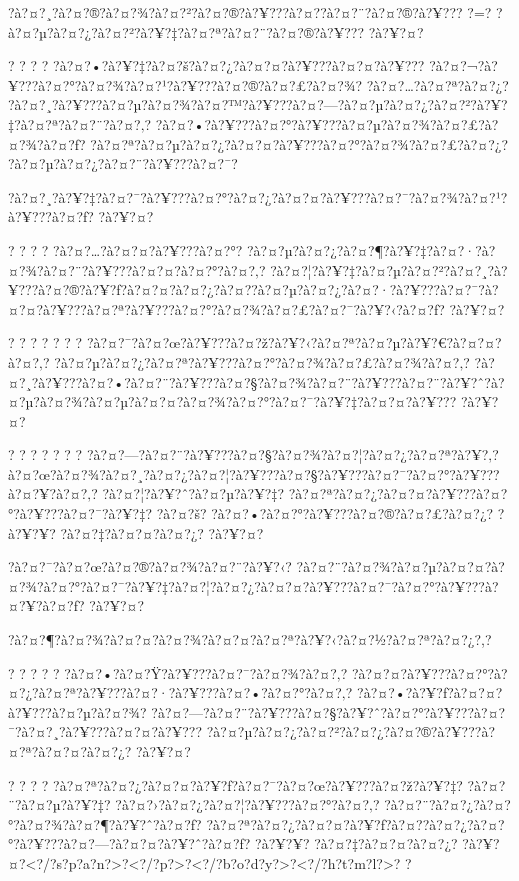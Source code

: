 \documentclass[11pt, openany]{book}
\begin{document}
{{{{{{{{{{{{{{{{{{?à?¤?¸?à?¤?®?à?¤?¾?à?¤?²?à?¤?®?à?¥???à?¤?­?à?¤?¨?à?¤?®?à?¥??? ?=?
?à?¤?µ?à?¤?¿?à?¤?²?à?¥?‡?à?¤?ª?à?¤?¨?à?¤?®?à?¥??? ?à?¥?¤?

? ? ? ? ?à?¤?•?à?¥?‡?à?¤?š?à?¤?¿?à?¤?¤?à?¥???à?¤?¤?à?¥???
?à?¤?¬?à?¥???à?¤?°?à?¤?¾?à?¤?¹?à?¥???à?¤?®?à?¤?£?à?¤?¾?
?à?¤?\ldots{}?à?¤?ª?à?¤?¿?
?à?¤?¸?à?¥???à?¤?µ?à?¤?¾?à?¤?™?à?¥???à?¤?---?à?¤?µ?à?¤?¿?à?¤?²?à?¥?‡?à?¤?ª?à?¤?¨?à?¤?‚?
?à?¤?•?à?¥???à?¤?°?à?¥???à?¤?µ?à?¤?¾?à?¤?£?à?¤?¾?à?¤?ƒ?
?à?¤?ª?à?¤?µ?à?¤?¿?à?¤?¤?à?¥???à?¤?°?à?¤?¾?à?¤?£?à?¤?¿?
?à?¤?µ?à?¤?¿?à?¤?¨?à?¥???à?¤?¯?

?à?¤?¸?à?¥?‡?à?¤?¯?à?¥???à?¤?°?à?¤?¿?à?¤?¤?à?¥???à?¤?¯?à?¤?¾?à?¤?¹?à?¥???à?¤?ƒ?
?à?¥?¤?

? ? ? ? ?à?¤?\ldots{}?à?¤?¤?à?¥???à?¤?°?
?à?¤?µ?à?¤?¿?à?¤?¶?à?¥?‡?à?¤?·?à?¤?¾?à?¤?¨?à?¥???à?¤?¤?à?¤?°?à?¤?‚?
?à?¤?¦?à?¥?‡?à?¤?µ?à?¤?²?à?¤?¸?à?¥???à?¤?®?à?¥?ƒ?à?¤?¤?à?¤?¿?à?¤?­?à?¤?µ?à?¤?¿?à?¤?·?à?¥???à?¤?¯?à?¤?¤?à?¥???à?¤?ª?à?¥???à?¤?°?à?¤?¾?à?¤?£?à?¤?¯?à?¥?‹?à?¤?ƒ?
?à?¥?¤?

? ? ? ? ? ? ?
?à?¤?¯?à?¤?œ?à?¥???à?¤?ž?à?¥?‹?à?¤?ª?à?¤?µ?à?¥?€?à?¤?¤?à?¤?‚?
?à?¤?µ?à?¤?¿?à?¤?ª?à?¥???à?¤?°?à?¤?¾?à?¤?£?à?¤?¾?à?¤?‚?
?à?¤?¸?à?¥???à?¤?•?à?¤?¨?à?¥???à?¤?§?à?¤?¾?à?¤?¨?à?¥???à?¤?¨?à?¥?ˆ?à?¤?µ?à?¤?¾?à?¤?µ?à?¤?¤?à?¤?¾?à?¤?°?à?¤?¯?à?¥?‡?à?¤?¤?à?¥???
?à?¥?¤?

? ? ? ? ? ? ?
?à?¤?---?à?¤?¨?à?¥???à?¤?§?à?¤?¾?à?¤?¦?à?¤?¿?à?¤?ª?à?¥?‚?à?¤?œ?à?¤?¾?à?¤?¸?à?¤?¿?à?¤?¦?à?¥???à?¤?§?à?¥???à?¤?¯?à?¤?°?à?¥???à?¤?¥?à?¤?‚?
?à?¤?¦?à?¥?ˆ?à?¤?µ?à?¥?‡?
?à?¤?ª?à?¤?¿?à?¤?¤?à?¥???à?¤?°?à?¥???à?¤?¯?à?¥?‡? ?à?¤?š?
?à?¤?•?à?¤?°?à?¥???à?¤?®?à?¤?£?à?¤?¿? ?à?¥?¥? ?à?¤?‡?à?¤?¤?à?¤?¿?
?à?¥?¤?

?à?¤?¯?à?¤?œ?à?¤?®?à?¤?¾?à?¤?¨?à?¥?‹?
?à?¤?¨?à?¤?¾?à?¤?µ?à?¤?¤?à?¤?¾?à?¤?°?à?¤?¯?à?¥?‡?à?¤?¦?à?¤?¿?à?¤?¤?à?¥???à?¤?¯?à?¤?°?à?¥???à?¤?¥?à?¤?ƒ?
?à?¥?¤?

?à?¤?¶?à?¤?¾?à?¤?¤?à?¤?¾?à?¤?¤?à?¤?ª?à?¥?‹?à?¤?½?à?¤?ª?à?¤?¿?,?

? ? ? ? ? ?à?¤?•?à?¤?Ÿ?à?¥???à?¤?¯?à?¤?¾?à?¤?‚?
?à?¤?¤?à?¥???à?¤?°?à?¤?¿?à?¤?ª?à?¥???à?¤?·?à?¥???à?¤?•?à?¤?°?à?¤?‚?
?à?¤?•?à?¥?ƒ?à?¤?¤?à?¥???à?¤?µ?à?¤?¾?
?à?¤?---?à?¤?¨?à?¥???à?¤?§?à?¥?ˆ?à?¤?°?à?¥???à?¤?¯?à?¤?¸?à?¥???à?¤?¤?à?¥???
?à?¤?µ?à?¤?¿?à?¤?²?à?¤?¿?à?¤?®?à?¥???à?¤?ª?à?¤?¤?à?¤?¿? ?à?¥?¤?

? ? ? ? ?à?¤?ª?à?¤?¿?à?¤?¤?à?¥?ƒ?à?¤?¯?à?¤?œ?à?¥???à?¤?ž?à?¥?‡?
?à?¤?¨?à?¤?µ?à?¥?‡? ?à?¤?›?à?¤?¿?à?¤?¦?à?¥???à?¤?°?à?¤?‚?
?à?¤?¨?à?¤?¿?à?¤?°?à?¤?¾?à?¤?¶?à?¥?ˆ?à?¤?ƒ?
?à?¤?ª?à?¤?¿?à?¤?¤?à?¥?ƒ?à?¤?­?à?¤?¿?à?¤?°?à?¥???à?¤?---?à?¤?¤?à?¥?ˆ?à?¤?ƒ?
?à?¥?¥? ?à?¤?‡?à?¤?¤?à?¤?¿?
?à?¥?¤?\textless{}?/?s?p?a?n?\textgreater{}?\textless{}?/?p?\textgreater{}?\textless{}?/?b?o?d?y?\textgreater{}?\textless{}?/?h?t?m?l?\textgreater{}?
?

}}}}}}}}}}}}}}}}}}
\end{document}
